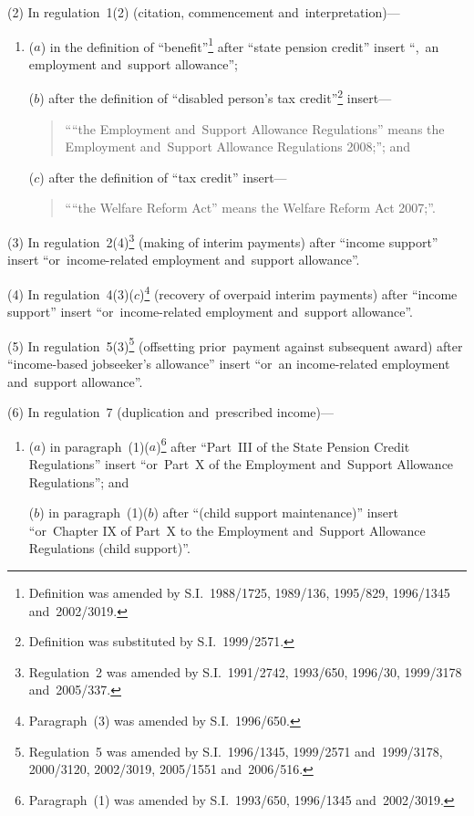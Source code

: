 \documentclass[12pt,a4paper]{article}
\begin{document}
(2) In regulation~1(2) (citation, commencement and~interpretation)—
\begin{enumerate}\item[]
($a$) in the definition of “benefit”\footnote{Definition was amended by S.I.~1988/1725, 1989/136, 1995/829, 1996/1345 and~2002/3019.} after “state pension credit” insert “,~an employment and~support allowance”;

($b$) after the definition of “disabled person’s tax credit”\footnote{Definition was substituted by S.I.~1999/2571.} insert—
\begin{quotation}
““the Employment and~Support Allowance Regulations” means the Employment and~Support Allowance Regulations 2008;”; and
\end{quotation}

($c$) after the definition of “tax credit” insert—
\begin{quotation}
““the Welfare Reform Act” means the Welfare Reform Act 2007;”.
\end{quotation}
\end{enumerate}

(3) In regulation~2(4)\footnote{Regulation~2 was amended by S.I.~1991/2742, 1993/650, 1996/30, 1999/3178 and~2005/337.} (making of interim payments) after “income support” insert “or~income-related employment and~support allowance”.

(4) In regulation~4(3)($c$)\footnote{Paragraph~(3) was amended by S.I.~1996/650.} (recovery of overpaid interim payments) after “income support” insert “or~income-related employment and~support allowance”.

(5) In regulation~5(3)\footnote{Regulation~5 was amended by S.I.~1996/1345, 1999/2571 and~1999/3178, 2000/3120, 2002/3019, 2005/1551 and~2006/516.} (offsetting prior~payment against subsequent award) after “income-based jobseeker’s allowance” insert “or~an income-related employment and~support allowance”.

(6) In regulation~7 (duplication and~prescribed income)—
\begin{enumerate}\item[]
($a$) in paragraph~(1)($a$)\footnote{Paragraph~(1) was amended by S.I.~1993/650, 1996/1345 and~2002/3019.} after “Part~III of the State Pension Credit Regulations” insert “or~Part~X of the Employment and~Support Allowance Regulations”; and

($b$) in paragraph~(1)($b$)  after “(child support maintenance)” insert “or~Chapter IX of Part~X to the Employment and~Support Allowance Regulations (child support)”.
\end{enumerate}
\end{document}

